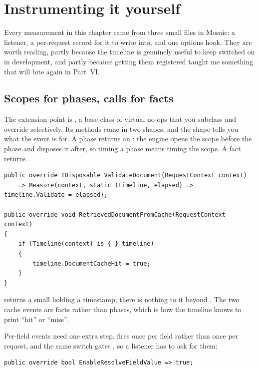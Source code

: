 \section{Instrumenting it yourself}
\label{sec:ch03-instrumenting}

Every measurement in this chapter came from three small files in Mosaic: a
listener, a per-request record for it to write into, and one options hook. They
are worth reading, partly because the timeline is genuinely useful to keep
switched on in development, and partly because getting them registered taught me
something that will bite again in Part~VI.

\subsection*{Scopes for phases, calls for facts}

%
The extension point is , a base class of
virtual no-ops that you subclass and override selectively. Its methods come in
two shapes, and the shape tells you what the event is for. A phase returns an
: the engine opens the scope before the phase and disposes it
after, so timing a phase means timing the scope. A fact returns .

\begin{verbatim}
public override IDisposable ValidateDocument(RequestContext context)
    => Measure(context, static (timeline, elapsed) => timeline.Validate = elapsed);

public override void RetrievedDocumentFromCache(RequestContext context)
{
    if (Timeline(context) is { } timeline)
    {
        timeline.DocumentCacheHit = true;
    }
}
\end{verbatim}

 returns a small  holding a timestamp; there is
nothing to it beyond . The two cache events are
facts rather than phases, which is how the timeline knows to print
\enquote{hit} or \enquote{miss}.

%
Per-field events need one extra step.  fires once per
field rather than once per request, and the same switch gates , so
a listener has to ask for them:

\begin{verbatim}
public override bool EnableResolveFieldValue => true;
\end{verbatim}

